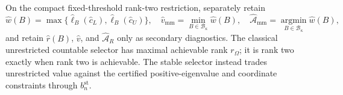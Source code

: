On the compact fixed-threshold rank-two restriction, separately retain
\[
\widehat w(B)=\max\{\widehat\ell_B(\widehat c_L),\widehat\ell_B(\widehat c_U)\},
\quad
\widehat v_{\mathrm{mm}}=\min_{B\in\mathcal B_\kappa}\widehat w(B),
\quad
\widehat{\mathcal A}_{\mathrm{mm}}=\operatorname*{argmin}_{B\in\mathcal B_\kappa}\widehat w(B),
\]
and retain \(\widehat r(B)\), \(\widehat v\), and \(\widehat{\mathcal A}_R\) only as secondary diagnostics.  The classical unrestricted countable selector has maximal achievable rank \(r_\Omega\); it is rank two exactly when rank two is achievable.  The stable selector instead trades unrestricted value against the certified positive-eigenvalue and coordinate constraints through \(b_n^{\mathrm{st}}\).